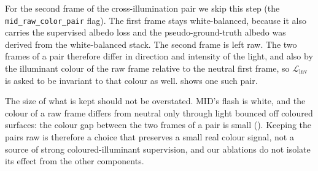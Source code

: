 For the second frame of the cross-illumination pair we skip this step (the
\texttt{mid\_raw\_color\_pair} flag). The first frame stays white-balanced, because it also
carries the supervised albedo loss and the pseudo-ground-truth albedo was derived from the
white-balanced stack. The second frame is left raw. The two frames of a pair therefore
differ in direction and intensity of the light, and also by the illuminant colour of the raw
frame relative to the neutral first frame, so $\mathcal{L}_{\text{inv}}$ is asked to be
invariant to that colour as well.  shows one such pair.

The size of what is kept should not be overstated. MID's flash is white, and the colour
of a raw frame differs from neutral only through light bounced off coloured surfaces:
the colour gap between the two frames of a pair is small (). Keeping the pairs raw is therefore a choice that
preserves a small real colour signal, not a source of strong coloured-illuminant
supervision, and our ablations do not isolate its effect from the other components.

